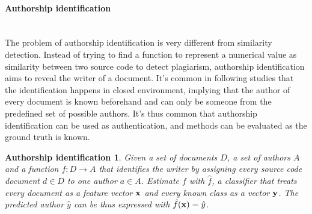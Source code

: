 \paragraph{Authorship identification}\mbox{}\\
The problem of authorship identification is very different from similarity detection. Instead of trying to find a function to represent a numerical value as similarity between two source code to detect plagiarism, authorship identification aims to reveal the writer of a document. It's common in following studies that the identification happens in closed environment, implying that the author of every document is known beforehand and can only be someone from the predefined set of possible authors. It's thus common that authorship identification can be used as authentication, and methods can be evaluated as the ground truth is known.

\newtheorem*{aui}{Authorship identification}
\begin{aui}
Given a set of documents $D$, a set of authors $A$ and a function $f: D \rightarrow A$ that identifies the writer by assigning every source code document $d \in D$ to one author $a \in A$. Estimate $f$ with $\hat{f}$, a classifier that treats every document as a feature vector $\mathbf{x}$ and every known class as a vector $\mathbf{y}$. The predicted author $\hat{y}$ can be thus expressed with $\hat{f}(\mathbf{x}) = \hat{y}$.
\end{aui}



